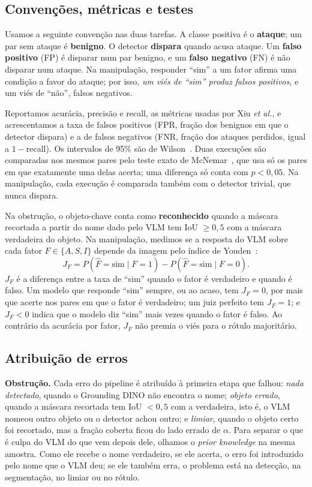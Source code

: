 \documentclass[conference]{IEEEtran}
\begin{document}
\subsection{Convenções, métricas e testes}
\label{sec:metricas}
Usamos a seguinte convenção nas duas tarefas. A classe positiva é o \textbf{ataque}; um par sem ataque é
\textbf{benigno}. O detector \textbf{dispara} quando acusa ataque. Um \textbf{falso positivo} (FP) é
disparar num par benigno, e um \textbf{falso negativo} (FN) é não disparar num ataque. Na manipulação,
responder ``sim'' a um fator afirma uma condição a favor do ataque; por isso, \emph{um viés de ``sim''
produz falsos positivos}, e um viés de ``não'', falsos negativos.

Reportamos acurácia, precisão e recall, as métricas usadas por Xiu \emph{et al.}, e acrescentamos a taxa
de falsos positivos (FPR, fração dos benignos em que o detector dispara) e a de falsos negativos (FNR,
fração dos ataques perdidos, igual a $1-$recall). Os intervalos de 95\% são de Wilson~\cite{wilson}. Duas
execuções são comparadas nos mesmos pares pelo teste exato de McNemar~\cite{mcnemar1947,dietterich1998},
que usa só os pares em que exatamente uma delas acerta; uma diferença só conta com $p<0{,}05$. Na
manipulação, cada execução é comparada também com o detector trivial, que nunca dispara.

Na obstrução, o objeto-chave conta como \textbf{reconhecido} quando a máscara recortada a partir do nome
dado pelo VLM tem IoU $\geq 0{,}5$ com a máscara verdadeira do objeto. Na manipulação, medimos se a
resposta do VLM sobre cada fator $F\in\{A,S,I\}$ depende da imagem pelo índice de Youden~\cite{youden1950}:
\begin{equation}
J_F = P(\hat F=\text{sim}\mid F=1) - P(\hat F=\text{sim}\mid F=0).
\label{eq:youden}
\end{equation}
$J_F$ é a diferença entre a taxa de ``sim'' quando o fator é verdadeiro e quando é falso. Um modelo que
responde ``sim'' sempre, ou ao acaso, tem $J_F=0$, por mais que acerte nos pares em que o fator é
verdadeiro; um juiz perfeito tem $J_F=1$; e $J_F<0$ indica que o modelo diz ``sim'' mais vezes quando o
fator é falso. Ao contrário da acurácia por fator, $J_F$ não premia o viés para o rótulo majoritário.

\subsection{Atribuição de erros}
\label{sec:atrib}
\textbf{Obstrução.} Cada erro do pipeline é atribuído à primeira etapa que falhou: \emph{nada
detectado}, quando o Grounding DINO não encontra o nome; \emph{objeto errado}, quando a máscara
recortada tem IoU $<0{,}5$ com a verdadeira, isto é, o VLM nomeou outro objeto ou o detector achou outro;
e \emph{limiar}, quando o objeto certo foi recortado, mas a fração coberta ficou do lado errado de
$\alpha$. Para separar o que é culpa do VLM do que vem depois dele, olhamos o \emph{prior knowledge} na
mesma amostra. Como ele recebe o nome verdadeiro, se ele acerta, o erro foi introduzido pelo nome que o
VLM deu; se ele também erra, o problema está na detecção, na segmentação, no limiar ou no rótulo.
\end{document}
